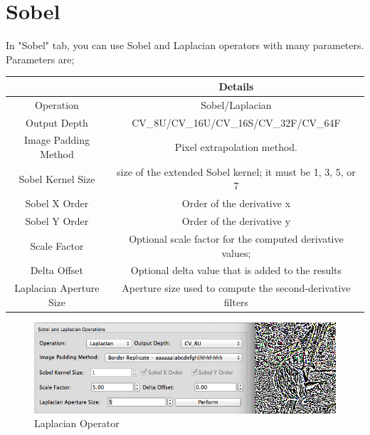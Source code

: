 \documentclass{article}
\begin{document}
\section{Sobel}

In "Sobel" tab, you can use Sobel and Laplacian operators with many parameters.	Parameters are;

\begin{table}[H]
\begin{center}
\begin{tabular}{|c|c|l|l|l|}
\hline
\textbf{}               & \multicolumn{4}{|c|}{\textbf{Details}}                                            \\ \hline
Operation               & \multicolumn{4}{|c|}{Sobel/Laplacian}                                             \\ \hline
Output Depth            & \multicolumn{4}{|c|}{CV\_8U/CV\_16U/CV\_16S/CV\_32F/CV\_64F}                      \\ \hline
Image Padding Method    & \multicolumn{4}{|c|}{Pixel extrapolation method.}                            \\ \hline
Sobel Kernel Size       & \multicolumn{4}{|c|}{size of the extended Sobel kernel; it must be 1, 3, 5, or 7} \\ \hline
Sobel X Order           & \multicolumn{4}{|c|}{Order of the derivative x}                                   \\ \hline
Sobel Y Order           & \multicolumn{4}{|c|}{Order of the derivative y}                                   \\ \hline
Scale Factor            & \multicolumn{4}{|c|}{Optional scale factor for the computed derivative values;}   \\ \hline
Delta Offset            & \multicolumn{4}{|c|}{Optional delta value that is added to the results}           \\ \hline
Laplacian Aperture Size & \multicolumn{4}{|c|}{Aperture size used to compute the second-derivative filters} \\ \hline
\end{tabular}
\end{center}
\end{table}


\begin{figure}[H]
\begin{center}
\includegraphics[scale=0.5]{toolboxSobel.png}
\caption{Laplacian Operator}
\end{center}
\end{figure}	
\end{document}
